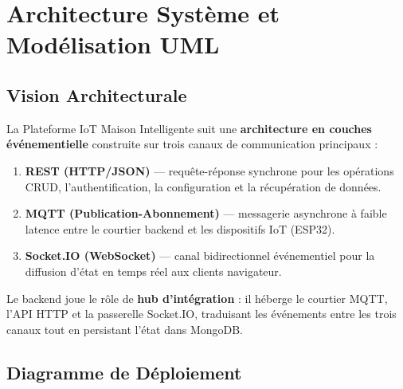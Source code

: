 \chapter{Architecture Système et Modélisation UML}

\section{Vision Architecturale}

La Plateforme IoT Maison Intelligente suit une \textbf{architecture en couches
événementielle} construite sur trois canaux de communication principaux :

\begin{enumerate}[leftmargin=1.5cm,itemsep=6pt]
  \item \textbf{REST (HTTP/JSON)} --- requête-réponse synchrone pour les opérations
        CRUD, l'authentification, la configuration et la récupération de données.
  \item \textbf{MQTT (Publication-Abonnement)} --- messagerie asynchrone à faible
        latence entre le courtier backend et les dispositifs IoT (ESP32).
  \item \textbf{Socket.IO (WebSocket)} --- canal bidirectionnel événementiel pour la
        diffusion d'état en temps réel aux clients navigateur.
\end{enumerate}

Le backend joue le rôle de \textbf{hub d'intégration} : il héberge le courtier MQTT,
l'API HTTP et la passerelle Socket.IO, traduisant les événements entre les trois canaux
tout en persistant l'état dans MongoDB.

\section{Diagramme de Déploiement}

